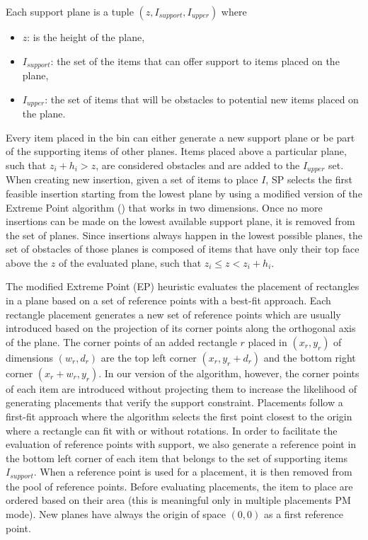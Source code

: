 Each support plane is a tuple $(z, I_{support}, I_{upper})$ where
\begin{itemize}
    \item $z$: is the height of the plane,
    \item $I_{support}$: the set of the items that can offer support to items placed on the plane,
    \item $I_{upper}$: the set of items that will be obstacles to potential new items placed on the plane.
\end{itemize}

Every item placed in the bin can either generate a new support plane or be part of the supporting items of other planes.
Items placed above a particular plane, such that $z_i + h_i > z$, are considered obstacles and are added to the $I_{upper}$ set.
When creating new insertion, given a set of items to place $I$, SP selects the first feasible insertion starting from the lowest plane by using a modified version of the Extreme Point algorithm (\cite{crainic2008extreme}) that works in two dimensions.
Once no more insertions can be made on the lowest available support plane, it is removed from the set of planes.
Since insertions always happen in the lowest possible planes, the set of obstacles of those planes is composed of items that have only their top face above the $z$ of the evaluated plane, such that $z_i \le z < z_i + h_i$.

The modified Extreme Point (EP) heuristic evaluates the placement of rectangles in a plane based on a set of reference points with a best-fit approach.
Each rectangle placement generates a new set of reference points which are usually introduced based on the projection of its corner points along the orthogonal axis of the plane.
The corner points of an added rectangle $r$ placed in $(x_r, y_r)$ of dimensions $(w_r, d_r)$ are the top left corner $(x_r, y_r + d_r)$ and the bottom right corner $(x_r + w_r, y_r)$.
In our version of the algorithm, however, the corner points of each item are introduced without projecting them to increase the likelihood of generating placements that verify the support constraint.
Placements follow a first-fit approach where the algorithm selects the first point closest to the origin where a rectangle can fit with or without rotations.
In order to facilitate the evaluation of reference points with support, we also generate a reference point in the bottom left corner of each item that belongs to the set of supporting items $I_{support}$.
When a reference point is used for a placement, it is then removed from the pool of reference points.
Before evaluating placements, the item to place are ordered based on their area (this is meaningful only in multiple placements PM mode).
New planes have always the origin of space $(0,0)$ as a first reference point.

